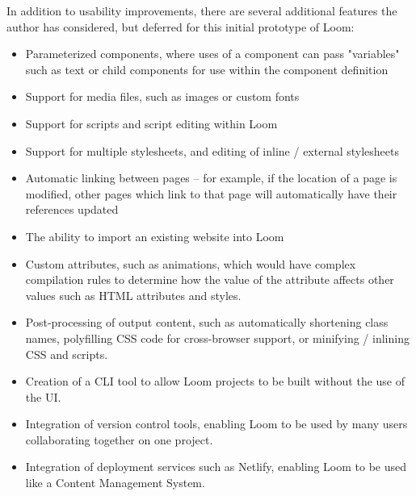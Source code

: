 \documentclass[conference, letterpaper]{IEEEtran}
\begin{document}
In addition to usability improvements, there are several additional features the author has considered, but deferred for this initial prototype of Loom:
\begin{itemize}
  \item Parameterized components, where uses of a component can pass "variables" such as text or child components for use within the component definition
  \item Support for media files, such as images or custom fonts
  \item Support for scripts and script editing within Loom
  \item Support for multiple stylesheets, and editing of inline / external stylesheets
  \item Automatic linking between pages -- for example, if the location of a page is modified, other pages which link to that page will automatically have their references updated
  \item The ability to import an existing website into Loom
  \item Custom attributes, such as animations, which would have complex compilation rules to determine how the value of the attribute affects other values such as HTML attributes and styles.
  \item Post-processing of output content, such as automatically shortening class names, polyfilling CSS code for cross-browser support, or minifying / inlining CSS and scripts.
  \item Creation of a CLI tool to allow Loom projects to be built without the use of the UI.
  \item Integration of version control tools, enabling Loom to be used by many users collaborating together on one project.
  \item Integration of deployment services such as Netlify\cite{Netlify}, enabling Loom to be used like a Content Management System.
\end{itemize}




\end{document}

